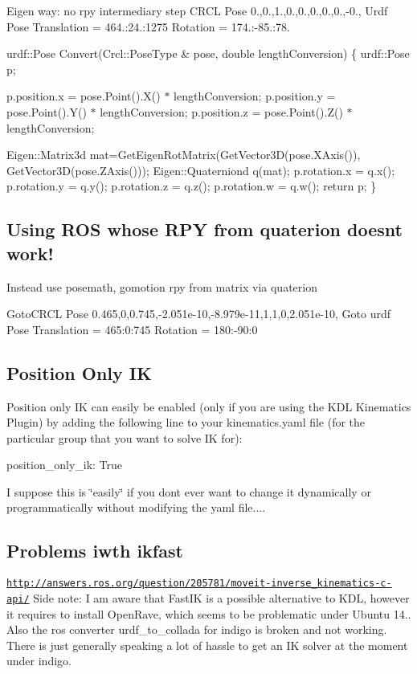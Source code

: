 Eigen way\-: no rpy intermediary step C\-R\-C\-L Pose 0.,0.,1.,0.,0.,0.,0.,0.,-\/0., Urdf Pose Translation = 464.\-:24.\-:1275 Rotation = 174.\-:-\/85.\-:78.

urdf\-::\-Pose Convert(\-Crcl\-::\-Pose\-Type \& pose, double length\-Conversion) \{ urdf\-::\-Pose p;

p.\-position.\-x = pose.\-Point().X() $\ast$ length\-Conversion; p.\-position.\-y = pose.\-Point().Y() $\ast$ length\-Conversion; p.\-position.\-z = pose.\-Point().Z() $\ast$ length\-Conversion;

Eigen\-::\-Matrix3d mat=Get\-Eigen\-Rot\-Matrix(Get\-Vector3\-D(pose.\-X\-Axis()), Get\-Vector3\-D(pose.\-Z\-Axis())); Eigen\-::\-Quaterniond q(mat); p.\-rotation.\-x = q.\-x(); p.\-rotation.\-y = q.\-y(); p.\-rotation.\-z = q.\-z(); p.\-rotation.\-w = q.\-w(); return p; \}

\subsection*{Using R\-O\-S whose R\-P\-Y from quaterion doesnt work! }

Instead use posemath, gomotion rpy from matrix via quaterion \begin{DoxyVerb}GotoCRCL Pose 0.465,0,0.745,-2.051e-10,-8.979e-11,1,1,0,2.051e-10,
Goto urdf Pose Translation = 465:0:745
Rotation = 180:-90:0
\end{DoxyVerb}


\subsection*{Position Only I\-K }

Position only I\-K can easily be enabled (only if you are using the K\-D\-L Kinematics Plugin) by adding the following line to your kinematics.\-yaml file (for the particular group that you want to solve I\-K for)\-:

position\-\_\-only\-\_\-ik\-: True

I suppose this is \char`\"{}easily\char`\"{} if you dont ever want to change it dynamically or programmatically without modifying the yaml file....

\subsection*{Problems iwth ikfast }

\href{http://answers.ros.org/question/205781/moveit-inverse_kinematics-c-api/}{\tt http\-://answers.\-ros.\-org/question/205781/moveit-\/inverse\-\_\-kinematics-\/c-\/api/} Side note\-: I am aware that Fast\-I\-K is a possible alternative to K\-D\-L, however it requires to install Open\-Rave, which seems to be problematic under Ubuntu 14.. Also the ros converter urdf\-\_\-to\-\_\-collada for indigo is broken and not working. There is just generally speaking a lot of hassle to get an I\-K solver at the moment under indigo.

